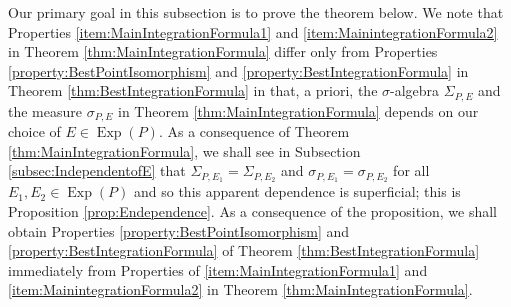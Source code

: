 \documentclass[11pt]{article}
\newcommand\Exp{\operatorname{Exp}}
\begin{document}
\noindent Our primary goal in this subsection is to prove the theorem below. We note that Properties \ref{item:MainIntegrationFormula1} and \ref{item:MainintegrationFormula2} in Theorem \ref{thm:MainIntegrationFormula} differ only from Properties \ref{property:BestPointIsomorphism} and \ref{property:BestIntegrationFormula} in Theorem \ref{thm:BestIntegrationFormula} in that, a priori, the $\sigma$-algebra $\Sigma_{P,E}$ and the measure $\sigma_{P,E}$ in Theorem \ref{thm:MainIntegrationFormula} depends on our choice of $E\in\Exp(P)$. As a consequence of Theorem \ref{thm:MainIntegrationFormula}, we shall see in Subsection \ref{subsec:IndependentofE} that $\Sigma_{P,E_1}=\Sigma_{P,E_2}$ and $\sigma_{P,E_1}=\sigma_{P,E_2}$ for all $E_1,E_2\in\Exp(P)$ and so this apparent dependence is superficial; this is Proposition \ref{prop:Endependence}. As a consequence of the proposition, we shall obtain Properties \ref{property:BestPointIsomorphism} and \ref{property:BestIntegrationFormula} of Theorem \ref{thm:BestIntegrationFormula} immediately from Properties of \ref{item:MainIntegrationFormula1} and \ref{item:MainintegrationFormula2} in Theorem \ref{thm:MainIntegrationFormula}.
\end{document}
